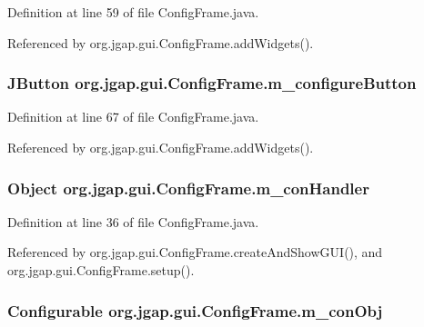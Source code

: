 Definition at line 59 of file Config\-Frame.\-java.



Referenced by org.\-jgap.\-gui.\-Config\-Frame.\-add\-Widgets().

\hypertarget{classorg_1_1jgap_1_1gui_1_1_config_frame_a34bfddcd6610f449dd8810a05c8244b1}{
\subsubsection[{m\-\_\-configure\-Button}]{\setlength{\rightskip}{0pt plus 5cm}J\-Button org.\-jgap.\-gui.\-Config\-Frame.\-m\-\_\-configure\-Button\hspace{0.3cm}{\ttfamily [private]}}}\label{classorg_1_1jgap_1_1gui_1_1_config_frame_a34bfddcd6610f449dd8810a05c8244b1}


Definition at line 67 of file Config\-Frame.\-java.



Referenced by org.\-jgap.\-gui.\-Config\-Frame.\-add\-Widgets().

\hypertarget{classorg_1_1jgap_1_1gui_1_1_config_frame_a9f94873bf7a289b5e75d4d7b0c232234}{
\subsubsection[{m\-\_\-con\-Handler}]{\setlength{\rightskip}{0pt plus 5cm}Object org.\-jgap.\-gui.\-Config\-Frame.\-m\-\_\-con\-Handler\hspace{0.3cm}{\ttfamily [private]}}}\label{classorg_1_1jgap_1_1gui_1_1_config_frame_a9f94873bf7a289b5e75d4d7b0c232234}


Definition at line 36 of file Config\-Frame.\-java.



Referenced by org.\-jgap.\-gui.\-Config\-Frame.\-create\-And\-Show\-G\-U\-I(), and org.\-jgap.\-gui.\-Config\-Frame.\-setup().

\hypertarget{classorg_1_1jgap_1_1gui_1_1_config_frame_aa0f5b29073c5dcb21b1772000223ce8e}{
\subsubsection[{m\-\_\-con\-Obj}]{\setlength{\rightskip}{0pt plus 5cm}Configurable org.\-jgap.\-gui.\-Config\-Frame.\-m\-\_\-con\-Obj\hspace{0.3cm}{\ttfamily [private]}}}\label{classorg_1_1jgap_1_1gui_1_1_config_frame_aa0f5b29073c5dcb21b1772000223ce8e}



